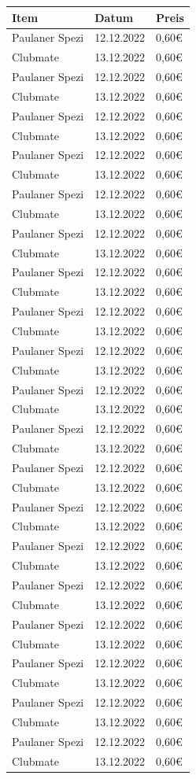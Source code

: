 \documentclass{article}
\begin{document}
\begin{center}
\begin{longtable}{>{\raggedright}p{8cm}>{\raggedright}p{3cm}>{\raggedright}p{2.5cm}}
\toprule
Item & Datum & Preis\tabularnewline\midrule
\rowcolor[gray]{.9} Paulaner Spezi    & 12.12.2022     & 0,60€\tabularnewline
Clubmate    & 13.12.2022     & 0,60€\tabularnewline
\rowcolor[gray]{.9} Paulaner Spezi    & 12.12.2022     & 0,60€\tabularnewline
Clubmate    & 13.12.2022     & 0,60€\tabularnewline
\rowcolor[gray]{.9} Paulaner Spezi    & 12.12.2022     & 0,60€\tabularnewline
Clubmate    & 13.12.2022     & 0,60€\tabularnewline
\rowcolor[gray]{.9} Paulaner Spezi    & 12.12.2022     & 0,60€\tabularnewline
Clubmate    & 13.12.2022     & 0,60€\tabularnewline
\rowcolor[gray]{.9} Paulaner Spezi    & 12.12.2022     & 0,60€\tabularnewline
Clubmate    & 13.12.2022     & 0,60€\tabularnewline
\rowcolor[gray]{.9} Paulaner Spezi    & 12.12.2022     & 0,60€\tabularnewline
Clubmate    & 13.12.2022     & 0,60€\tabularnewline
\rowcolor[gray]{.9} Paulaner Spezi    & 12.12.2022     & 0,60€\tabularnewline
Clubmate    & 13.12.2022     & 0,60€\tabularnewline
\rowcolor[gray]{.9} Paulaner Spezi    & 12.12.2022     & 0,60€\tabularnewline
Clubmate    & 13.12.2022     & 0,60€\tabularnewline
\rowcolor[gray]{.9} Paulaner Spezi    & 12.12.2022     & 0,60€\tabularnewline
Clubmate    & 13.12.2022     & 0,60€\tabularnewline
\rowcolor[gray]{.9} Paulaner Spezi    & 12.12.2022     & 0,60€\tabularnewline
Clubmate    & 13.12.2022     & 0,60€\tabularnewline
\rowcolor[gray]{.9} Paulaner Spezi    & 12.12.2022     & 0,60€\tabularnewline
Clubmate    & 13.12.2022     & 0,60€\tabularnewline
\rowcolor[gray]{.9} Paulaner Spezi    & 12.12.2022     & 0,60€\tabularnewline
Clubmate    & 13.12.2022     & 0,60€\tabularnewline
\rowcolor[gray]{.9} Paulaner Spezi    & 12.12.2022     & 0,60€\tabularnewline
Clubmate    & 13.12.2022     & 0,60€\tabularnewline
\rowcolor[gray]{.9} Paulaner Spezi    & 12.12.2022     & 0,60€\tabularnewline
Clubmate    & 13.12.2022     & 0,60€\tabularnewline
\rowcolor[gray]{.9} Paulaner Spezi    & 12.12.2022     & 0,60€\tabularnewline
Clubmate    & 13.12.2022     & 0,60€\tabularnewline
\rowcolor[gray]{.9} Paulaner Spezi    & 12.12.2022     & 0,60€\tabularnewline
Clubmate    & 13.12.2022     & 0,60€\tabularnewline
\rowcolor[gray]{.9} Paulaner Spezi    & 12.12.2022     & 0,60€\tabularnewline
Clubmate    & 13.12.2022     & 0,60€\tabularnewline
\rowcolor[gray]{.9} Paulaner Spezi    & 12.12.2022     & 0,60€\tabularnewline
Clubmate    & 13.12.2022     & 0,60€\tabularnewline
\rowcolor[gray]{.9} Paulaner Spezi    & 12.12.2022     & 0,60€\tabularnewline
Clubmate    & 13.12.2022     & 0,60€\tabularnewline

\end{longtable}
\end{center}
\end{document}
